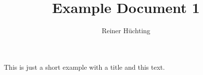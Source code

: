 \documentclass{scrartcl}
\title{Example Document 1}
\author{Reiner Hüchting}
\begin{document}
    \maketitle

    This is just a short example with a title and this text.
\end{document}
